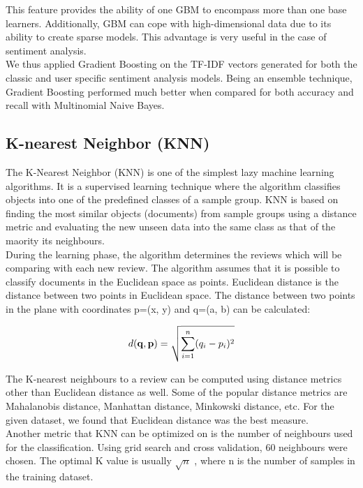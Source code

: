 \documentclass[letterpaper, 10 pt, conference]{ieeeconf}  %
\begin{document}
This feature provides the ability of one GBM to encompass more than one base learners. Additionally, GBM can cope with high-dimensional data due to its ability to create sparse models. This advantage is very useful in the case of sentiment analysis.\\

We thus applied Gradient Boosting on the TF-IDF vectors generated for both the classic and user specific sentiment analysis models. Being an ensemble technique, Gradient Boosting performed much better when compared for both accuracy and recall with Multinomial Naive Bayes.

\subsection{K-nearest Neighbor (KNN)}

The  K-Nearest  Neighbor  (KNN) \cite{c12}  is  one  of  the  simplest  lazy  machine  learning algorithms.  It is a supervised learning technique where the algorithm  classifies  objects  into  one  of  the  predefined classes  of  a  sample  group. KNN is based on finding the most similar objects (documents) from sample groups using a distance metric and evaluating the new unseen data into the same class as that of the maority its neighbours.\\

During the learning phase, the  algorithm determines  the  reviews  which  will  be  comparing  with  each  new  review. The  algorithm  assumes  that it  is  possible  to classify  documents  in  the  Euclidean  space  as  points.  Euclidean distance is the distance between two points in Euclidean space. The distance between two points in the plane with coordinates p=(x, y) and q=(a, b) can be calculated: 

$$ \begin{aligned}
        d(\mathbf {q} ,\mathbf {p} ) = {\sqrt {\sum _{i=1}^{n}(q_{i}-p_{i})^{2}}}
        \end{aligned} \\
$$
    
The K-nearest neighbours to a review can be computed using distance metrics other than Euclidean distance as well. Some of the popular distance metrics are Mahalanobis distance, Manhattan distance, Minkowski distance, etc. For the given dataset, we found that Euclidean distance was the best measure.\\

Another metric that KNN can be optimized on is the number of neighbours used for the classification. Using grid search and cross validation, 60 neighbours were chosen. The optimal K value is usually $\sqrt{n}$ , where n is the number of samples in the training dataset.\\
\end{document}

